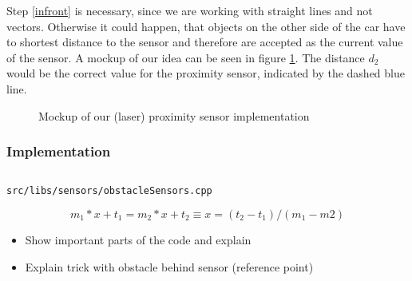 \documentclass[paper=a4, fontsize=11pt]{scrreprt}
\begin{document}
Step \ref{infront} is necessary, since we are working with straight lines
and not vectors. Otherwise it could happen,
that objects on the other side of the car have to shortest distance to the sensor
and therefore are accepted as the current value of the sensor.
A mockup of our idea can be seen in figure \ref{aw_mockup}.
The distance $d_2$ would be the correct value for the proximity sensor,
indicated by the dashed blue line.

\begin{figure}[ht]\label{aw_mockup}
  \begin{center}
    \caption{Mockup of our (laser) proximity sensor implementation}
  \end{center}
\end{figure}

\subsubsection{Implementation}

\begin{listing}[ht]\label{aw_sensor_position}
  \inputminted[firstline=91,linenos=true,lastline=96,gobble=2]{c++}{../../../simulators/speed-dreams/src/libs/sensors/obstacleSensors.cpp}
  \caption{\texttt{src/libs/sensors/obstacleSensors.cpp}}
\end{listing}

\begin{equation}
  m_1 * x + t_1 = m_2 * x + t_2 \equiv x = (t_2 - t_1) / (m_1 - m2)
\end{equation}


\begin{itemize}
  \item Show important parts of the code and explain
  \item Explain trick with obstacle behind sensor (reference point)
\end{itemize}
\end{document}
